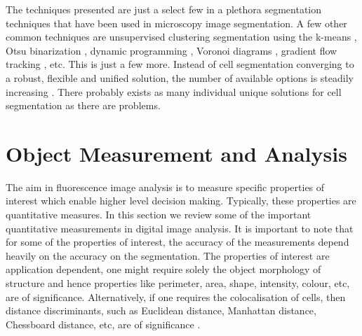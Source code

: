 \begin{definition}
	The techniques presented are just a select few in a plethora segmentation techniques that have been used in microscopy image segmentation.
	A few other common techniques are unsupervised clustering segmentation using the k-means \citep{Ng2006,Shrivastava2014,Dhanachandra2015}, Otsu binarization \citep{Chen2006}, dynamic programming \citep{Liu2007,Zhang2007}, Voronoi diagrams \citep{Cardenes2003,Jiang2005}, gradient flow tracking \citep{Li2007}, etc.
	This is just a few more.
	Instead of cell segmentation converging to a robust, flexible and unified solution, the number of available options is steadily increasing \citep{Meijering2012}.
	There probably exists as many individual unique solutions for cell segmentation as there are problems.
\end{definition}


\section{Object Measurement and Analysis}
\label{sec:Measurements}

The aim in fluorescence image analysis is to measure specific properties of interest which enable higher level decision making.
Typically, these properties are quantitative measures.
In this section we review some of the important quantitative measurements in digital image analysis.
It is important to note that for some of the properties of interest, the accuracy of the measurements depend heavily on the accuracy on the segmentation.
The properties of interest are application dependent, one might require solely the object morphology of structure and hence properties like perimeter, area, shape, intensity, colour, etc, are of significance.
Alternatively, if one requires the colocalisation of cells, then distance discriminants, such as Euclidean distance, Manhattan distance, Chessboard distance, etc, are of significance \citep{Fatima2008_2,Danek2012}.

